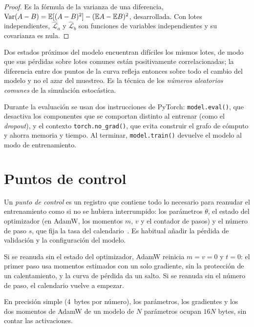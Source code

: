 \begin{proof}
Es la fórmula de la varianza de una diferencia, $\operatorname{Var}(A-B)=\mathbb{E}[(A-B)^{2}]-(\mathbb{E} A-\mathbb{E} B)^{2}$, desarrollada. Con lotes independientes, $\hat{\mathcal{L}}_a$ y $\hat{\mathcal{L}}_b$ son funciones de variables independientes y su covarianza es nula.
\end{proof}

Dos estados próximos del modelo encuentran difíciles los mismos lotes, de modo que sus pérdidas sobre lotes comunes están positivamente correlacionadas; la diferencia entre dos puntos de la curva refleja entonces sobre todo el cambio del modelo y no el azar del muestreo. Es la técnica de los \emph{números aleatorios comunes} de la simulación estocástica.

Durante la evaluación se usan dos instrucciones de PyTorch: \texttt{model.eval()}, que desactiva los componentes que se comportan distinto al entrenar (como el \emph{dropout}), y el contexto \texttt{torch.no\_grad()}, que evita construir el grafo de cómputo y ahorra memoria y tiempo. Al terminar, \texttt{model.train()} devuelve el modelo al modo de entrenamiento.

\section{Puntos de control}

\begin{definicion}\label{def:checkpoint}
Un \emph{punto de control} es un registro que contiene todo lo necesario para reanudar el entrenamiento como si no se hubiera interrumpido: los parámetros $\theta$, el estado del optimizador (en AdamW, los momentos $m$, $v$ y el contador de pasos) y el número de paso $s$, que fija la tasa del calendario~\cite[§5.2]{cs336}. Es habitual añadir la pérdida de validación y la configuración del modelo.
\end{definicion}

Si se reanuda sin el estado del optimizador, AdamW reinicia $m=v=0$ y $t=0$: el primer paso usa momentos estimados con un solo gradiente, sin la protección de un calentamiento, y la curva de pérdida da un salto. Si se reanuda sin el número de paso, el calendario vuelve a empezar.

\begin{proposicion}\label{prop:memoria}
En precisión simple (4~bytes por número), los parámetros, los gradientes y los dos momentos de AdamW de un modelo de $N$ parámetros ocupan $16N$ bytes, sin contar las activaciones.
\end{proposicion}

